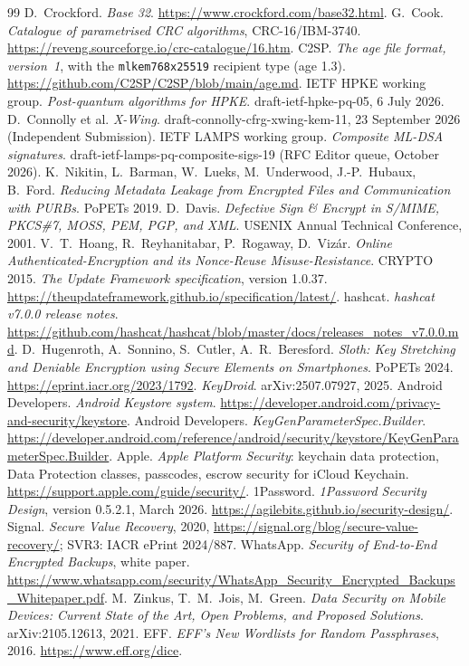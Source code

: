 \documentclass[11pt,a4paper]{article}
\begin{document}
\begin{thebibliography}{99}
 D.~Crockford. \emph{Base 32}. \url{https://www.crockford.com/base32.html}.
 G.~Cook. \emph{Catalogue of parametrised CRC algorithms}, CRC-16/IBM-3740. \url{https://reveng.sourceforge.io/crc-catalogue/16.htm}.
 C2SP. \emph{The age file format, version~1}, with the \texttt{mlkem768x25519} recipient type (age 1.3). \url{https://github.com/C2SP/C2SP/blob/main/age.md}.
 IETF HPKE working group. \emph{Post-quantum algorithms for HPKE}. draft-ietf-hpke-pq-05, 6 July 2026.
 D.~Connolly et al. \emph{X-Wing}. draft-connolly-cfrg-xwing-kem-11, 23 September 2026 (Independent Submission).
 IETF LAMPS working group. \emph{Composite ML-DSA signatures}. draft-ietf-lamps-pq-composite-sigs-19 (RFC Editor queue, October 2026).
 K.~Nikitin, L.~Barman, W.~Lueks, M.~Underwood, J.-P.~Hubaux, B.~Ford. \emph{Reducing Metadata Leakage from Encrypted Files and Communication with PURBs}. PoPETs 2019.
 D.~Davis. \emph{Defective Sign \& Encrypt in S/MIME, PKCS\#7, MOSS, PEM, PGP, and XML}. USENIX Annual Technical Conference, 2001.
 V.~T.~Hoang, R.~Reyhanitabar, P.~Rogaway, D.~Viz\'ar. \emph{Online Authenticated-Encryption and its Nonce-Reuse Misuse-Resistance}. CRYPTO 2015.
 \emph{The Update Framework specification}, version 1.0.37. \url{https://theupdateframework.github.io/specification/latest/}.
 hashcat. \emph{hashcat v7.0.0 release notes}. \url{https://github.com/hashcat/hashcat/blob/master/docs/releases_notes_v7.0.0.md}.
 D.~Hugenroth, A.~Sonnino, S.~Cutler, A.~R.~Beresford. \emph{Sloth: Key Stretching and Deniable Encryption using Secure Elements on Smartphones}. PoPETs 2024. \url{https://eprint.iacr.org/2023/1792}.
 \emph{KeyDroid}. arXiv:2507.07927, 2025.
 Android Developers. \emph{Android Keystore system}. \url{https://developer.android.com/privacy-and-security/keystore}.
 Android Developers. \emph{KeyGenParameterSpec.Builder}. \url{https://developer.android.com/reference/android/security/keystore/KeyGenParameterSpec.Builder}.
 Apple. \emph{Apple Platform Security}: keychain data protection, Data Protection classes, passcodes, escrow security for iCloud Keychain. \url{https://support.apple.com/guide/security/}.
 1Password. \emph{1Password Security Design}, version 0.5.2.1, March 2026. \url{https://agilebits.github.io/security-design/}.
 Signal. \emph{Secure Value Recovery}, 2020, \url{https://signal.org/blog/secure-value-recovery/}; SVR3: IACR ePrint 2024/887.
 WhatsApp. \emph{Security of End-to-End Encrypted Backups}, white paper. \url{https://www.whatsapp.com/security/WhatsApp_Security_Encrypted_Backups_Whitepaper.pdf}.
 M.~Zinkus, T.~M.~Jois, M.~Green. \emph{Data Security on Mobile Devices: Current State of the Art, Open Problems, and Proposed Solutions}. arXiv:2105.12613, 2021.
 EFF. \emph{EFF's New Wordlists for Random Passphrases}, 2016. \url{https://www.eff.org/dice}.
\end{thebibliography}
\end{document}
